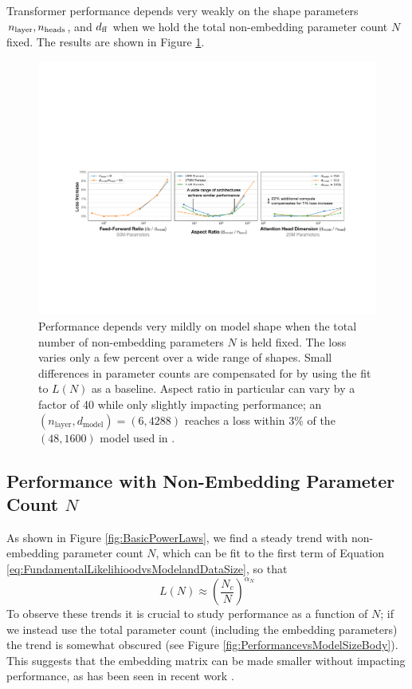 \documentclass[english]{article}
\newcommand{\be}{\begin{equation}}
\newcommand{\ee}{\end{equation}}
\begin{document}
Transformer performance depends very weakly on the shape parameters $n_{\rm layer}, n_{\rm heads}$, and $d_{\rm ff}$ when we hold the total non-embedding parameter count $N$ fixed.  
The results are shown in Figure \ref{fig:HeadsLayersIndependence}.

\begin{figure}
\includegraphics[width=\textwidth]{HyperparameterTuning}
 \caption[Weak dependence of performance on hyperparameter tuning]{Performance depends very mildly on model shape when the total number of non-embedding parameters $N$ is held fixed.  The loss varies only a few percent over a wide range of shapes.  Small differences in parameter counts are compensated for by using the fit to $L(N)$ as a baseline.  Aspect ratio in particular can vary by a factor of 40 while only slightly impacting performance; an $(n_{\mathrm{layer}}, d_{\mathrm{model}}) = (6, 4288)$ reaches a loss within 3\% of the $(48, 1600)$ model used in \cite{radford2019language}.  \label{fig:HeadsLayersIndependence}}
\end{figure}

\subsection{Performance with Non-Embedding Parameter Count $N$} 
\label{sec:PerformancevsModelSize}

As shown in  Figure \ref{fig:BasicPowerLaws}, we find a steady trend with non-embedding parameter count $N$, which can be fit to the first term of Equation \eqref{eq:FundamentalLikelihioodvsModelandDataSize}, so that
\be
L(N) \approx \left( \frac{N_c}{N} \right)^{ \alpha_N }
\ee  
To observe these trends it is crucial to study performance as a function of $N$; if we instead use the total parameter count (including the embedding parameters) the trend is somewhat obscured (see Figure \ref{fig:PerformancevsModelSizeBody}).  This suggests that the embedding matrix can be made smaller without impacting performance, as has been seen in recent work \cite{lan2019albert}.
\end{document}
